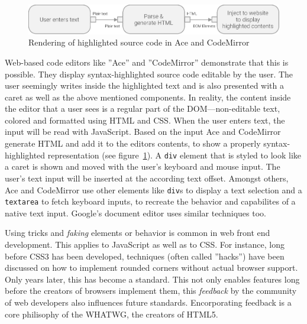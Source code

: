 \begin{figure}[!htb]
\centering
\includegraphics[scale=.7]{./images/ace-codemirror-uml.eps}
\caption{Rendering of highlighted source code in Ace and CodeMirror}
\label{fig:ace_rendering_uml}
\end{figure}


Web-based code editors like ''Ace'' and ''CodeMirror'' demonstrate that this is possible. They display syntax-highlighted source code editable by the user. The user seemingly writes inside the highlighted text and is also presented with a caret as well as the above mentioned components. In reality, the content inside the editor that a user sees is a regular part of the DOM---non-editable text, colored and formatted using HTML and CSS. When the user enters text, the input will be read with JavaScript. Based on the input Ace and CodeMirror generate HTML and add it to the editors contents, to show a properly syntax-highlighted representation (see figure~\ref{fig:ace_rendering_uml}). A \texttt{div} element that is styled to look like a caret is shown and moved with the user's keyboard and mouse input. The user's text input will be inserted at the according text offset. Amongst others, Ace and CodeMirror use other elements like \texttt{div}s to display a text selection and a \texttt{textarea} to fetch keyboard inputs, to recreate the behavior and capabilites of a native text input. Google's document editor uses similar techniques too.




Using tricks and \textit{faking} elements or behavior is common in web front end development. This applies to JavaScript as well as to CSS. For instance, long before CSS3 has been developed, techniques (often called ''hacks'') have been discussed on how to implement rounded corners without actual browser support. Only years later, this has become a standard. This not only enables features long before the creators of browsers implement them, this \textit{feedback} by the community of web developers also influences future standards. Encorporating feedback is a core philisophy of the WHATWG, the creators of HTML5.

